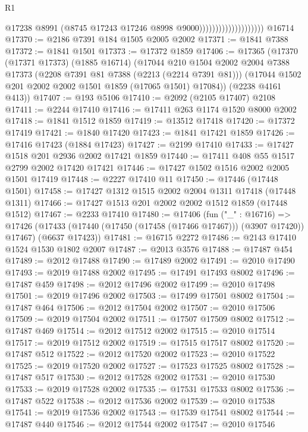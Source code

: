 \begin{lexlean}{R1}
\begin{coremodule}
                                          @17238
                                          @8991
                                          (@8745 @17243 @17246 @8998 @9000))))))))))))))))))))
    @16714
@17370 := @2186 @7391 @184 @1505 @2005 @2002
@17371 := @1841 @7388
@17372 := @1841 @1501
@17373 := @17372 @1859
@17406 := @17365
    (@17370
      (@17371 @17373)
      (@1885 @16714)
      (@17044
        @210
        @1504
        @2002
        @2004
        @7388
        @17373
        (@2208 @7391 @81 @7388 (@2213 (@2214 @7391 @81)))
        (@17044 @1502 @201 @2002 @2002 @1501 @1859 (@17065 @1501) @17084))
      (@2238 @4161 @413))
@17407 := @193 @5106
@17410 := @2092 (@2105 @17407) @2108
@17411 := @2244 @17410
@17416 := @17411 @263 @1174 @1520 @8000 @2002
@17418 := @1841 @1512 @1859
@17419 := @13512 @17418
@17420 := @17372 @17419
@17421 := @1840 @17420
@17423 := @1841 @17421 @1859
@17426 := @17416 @17423 (@1884 @17423)
@17427 := @2199 @17410
@17433 := @17427 @1518 @201 @2936 @2002 @17421 @1859
@17440 := @17411 @408 @55 @1517 @2799 @2002 @17420 @17421
@17446 := @17427 @1502 @1516 @2002 @2005 @1501 @17419
@17448 := @2227 @17410 @11
@17450 := @17446 (@17448 @1501)
@17458 := @17427 @1312 @1515 @2002 @2004 @1311 @17418 (@17448 @1311)
@17466 := @17427 @1513 @201 @2002 @2002 @1512 @1859 (@17448 @1512)
@17467 := @2233 @17410
@17480 := @17406
    (fun ("_" : @16716) =>
    @17426 (@17433 (@17440 (@17450 (@17458 (@17466 @17467))) (@3907 @17420)) @17467) (@6637 @17423))
@17481 := @16715 @2272
@17486 := @2143 @17410 @1524 @1530 @1802 @2007
@17487 := @2013 @3576
@17488 := @17487 @454
@17489 := @2012 @17488
@17490 := @17489 @2002
@17491 := @2010 @17490
@17493 := @2019 @17488 @2002
@17495 := @17491 @17493 @8002
@17496 := @17487 @459
@17498 := @2012 @17496 @2002
@17499 := @2010 @17498
@17501 := @2019 @17496 @2002
@17503 := @17499 @17501 @8002
@17504 := @17487 @464
@17506 := @2012 @17504 @2002
@17507 := @2010 @17506
@17509 := @2019 @17504 @2002
@17511 := @17507 @17509 @8002
@17512 := @17487 @469
@17514 := @2012 @17512 @2002
@17515 := @2010 @17514
@17517 := @2019 @17512 @2002
@17519 := @17515 @17517 @8002
@17520 := @17487 @512
@17522 := @2012 @17520 @2002
@17523 := @2010 @17522
@17525 := @2019 @17520 @2002
@17527 := @17523 @17525 @8002
@17528 := @17487 @517
@17530 := @2012 @17528 @2002
@17531 := @2010 @17530
@17533 := @2019 @17528 @2002
@17535 := @17531 @17533 @8002
@17536 := @17487 @522
@17538 := @2012 @17536 @2002
@17539 := @2010 @17538
@17541 := @2019 @17536 @2002
@17543 := @17539 @17541 @8002
@17544 := @17487 @440
@17546 := @2012 @17544 @2002
@17547 := @2010 @17546

\end{coremodule}
\end{lexlean}
